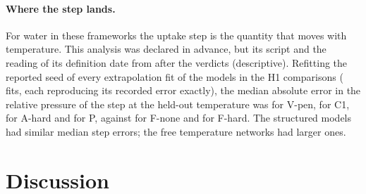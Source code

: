 \documentclass[journal=jcisd8,manuscript=article]{achemso}
\begin{document}
\paragraph{Where the step lands.} For water in these frameworks the uptake step is the quantity that moves with
temperature. This analysis was declared in advance, but its script and the reading of its definition date from after
the verdicts (descriptive). Refitting the reported seed of every extrapolation fit of the  models in the H1
comparisons ( fits, each reproducing its recorded error exactly), the median absolute error in the
relative pressure of the step at the held-out temperature was  for V-pen,  for C1,
 for A-hard and  for P, against  for F-none and
 for F-hard. The structured models had similar median step errors; the free temperature networks had
larger ones.

\section*{Discussion}
\end{document}
